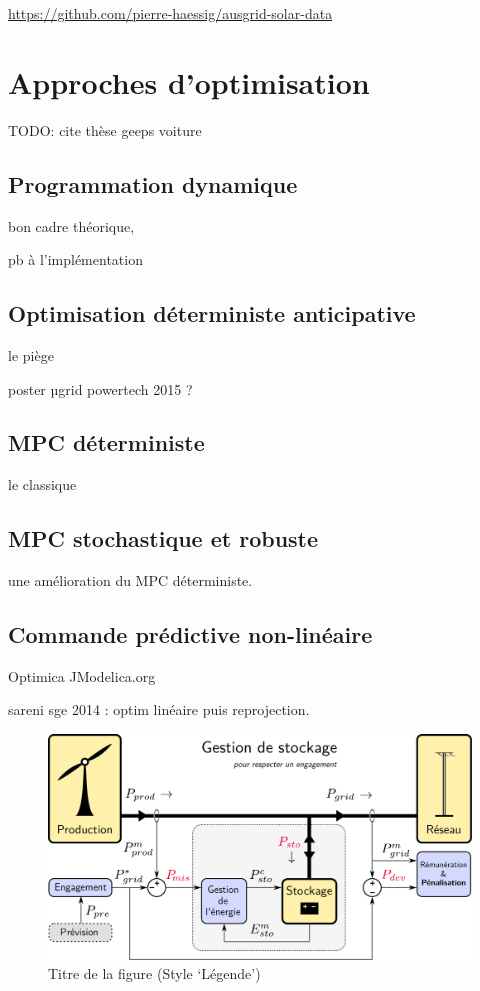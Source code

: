 \documentclass[a4paper,10pt,twocolumn]{article}
\begin{document}
\url{https://github.com/pierre-haessig/ausgrid-solar-data}


\section{Approches d'optimisation}




TODO: cite thèse geeps voiture

\subsection{Programmation dynamique}
bon cadre théorique,

pb à l'implémentation

\cite{Haessig:2013:ESPy}

\subsection{Optimisation déterministe anticipative}
le piège

\cite{Rigo-Mariani:2014:SGE}

poster µgrid powertech 2015 ?

\subsection{MPC déterministe}
le classique

\subsection{MPC stochastique et robuste}

une amélioration du MPC déterministe.

\subsection{Commande prédictive non-linéaire}

Optimica JModelica.org \cite{Akesson:2010:CCE}

sareni sge 2014 \cite{Rigo-Mariani:2014:SGE} : optim linéaire puis reprojection.

\begin{figure}[!ht]
	\begin{center}
		\includegraphics[width=0.6\columnwidth]{figures/wind_storage.pdf}
	\end{center}
	
	\caption{Titre de la figure (Style ‘Légende’)}
	\label{fig_1}
\end{figure}
\end{document}
